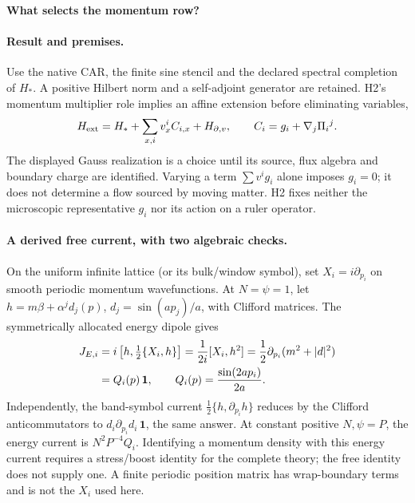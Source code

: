 \documentclass[10pt]{article}
\begin{document}
\begin{center}\textbf{What selects the momentum row?}\end{center}

\paragraph{Result and premises.}
Use the native CAR, the finite sine stencil and the declared
spectral completion of $H_*$. A positive Hilbert norm and a
self-adjoint generator are retained. H2's momentum multiplier
role implies an affine extension before eliminating variables,
\begin{equation}
 H_{\rm ext}=H_*+\sum_{x,i}v_x^i C_{i,x}+H_{\partial,v},\qquad
 C_i=g_i+\nabla_j\Pi_i{}^j .
 \label{eq:fm-affine}
\end{equation}
The displayed Gauss realization is a choice until its source,
flux algebra and boundary charge are identified. Varying a term
$\sum v^ig_i$ alone imposes $g_i=0$; it does not determine a
flow sourced by moving matter. H2 fixes neither the microscopic
representative $g_i$ nor its action on a ruler operator.

\paragraph{A derived free current, with two algebraic checks.}
On the uniform infinite lattice (or its bulk/window symbol), set
$X_i=i\partial_{p_i}$ on smooth periodic momentum wavefunctions.
At $N=\psi=1$, let
$h=m\beta+\alpha^jd_j(p)$, $d_j=\sin(ap_j)/a$, with Clifford
matrices. The symmetrically allocated energy dipole gives
\begin{align}
 J_{E,i}&=i\left[h,\tfrac12\{X_i,h\}\right]
       =\frac1{2i}[X_i,h^2]
       =\frac12\partial_{p_i}(m^2+|d|^2)\notag\\
       &=Q_i(p)\,\mathbf1,\qquad Q_i(p)=\frac{\sin(2ap_i)}{2a}.
 \label{eq:fm-free}
\end{align}
Independently, the band-symbol current
$\tfrac12\{h,\partial_{p_i}h\}$ reduces by the Clifford
anticommutators to $d_i\partial_{p_i}d_i\,\mathbf1$, the same
answer. At constant positive $N,\psi=P$, the energy current is
$N^2P^{-4}Q_i$. Identifying a momentum density with this energy
current requires a stress/boost identity for the complete theory;
the free identity does not supply one. A finite periodic position
matrix has wrap-boundary terms and is not the $X_i$ used here.
\end{document}

